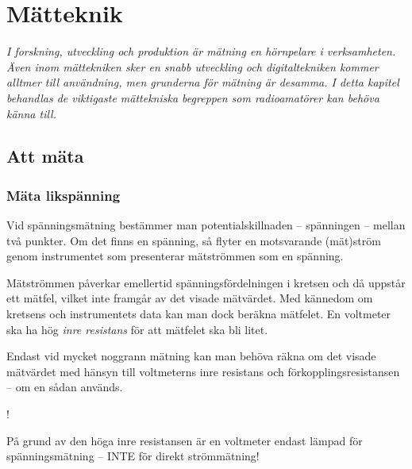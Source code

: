 \chapter{Mätteknik}

\emph{I forskning, utveckling och produktion är mätning en hörnpelare
  i verksamheten. Även inom mättekniken sker en snabb utveckling och
  digitaltekniken kommer alltmer till användning, men grunderna för
  mätning är desamma. I detta kapitel behandlas de viktigaste
  mättekniska begreppen som radioamatörer kan behöva känna till.}

\section{Att mäta}

\subsection{Mäta likspänning}

Vid spänningsmätning bestämmer man potentialskillnaden -- spänningen --
mellan två punkter.
Om det finns en spänning, så flyter en motsvarande (mät)ström genom
instrumentet som presenterar mätströmmen som en spänning.

Mätströmmen påverkar emellertid spänningsfördelningen i kretsen och då
uppstår ett mätfel, vilket inte framgår av det visade mätvärdet.
Med kännedom om kretsens och instrumentets data kan man dock beräkna mätfelet.
En voltmeter ska ha hög \emph{inre resistans} för att mätfelet ska bli litet.

Endast vid mycket noggrann mätning kan man behöva räkna om det visade
mätvärdet med hänsyn till voltmeterns inre resistans och
förkopplingsresistansen -- om en sådan används.

\begin{center}
\begin{minipage}{0.19\columnwidth}
  \Huge{\hspace{1ex}!}
\end{minipage}
\begin{minipage}{0.7\columnwidth}
På grund av den höga inre resistansen är en voltmeter endast lämpad
för spänningsmätning -- INTE för direkt strömmätning!
\end{minipage}
\end{center}

